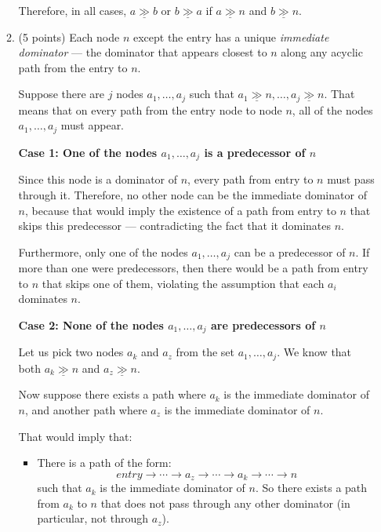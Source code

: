\documentclass[12pt]{article}
\newcommand{\dom}{\underline{\gg}}
\begin{document}
\begin{enumerate}
\begin{enumerate}
\begin{mdframed}
          \medskip

          Therefore, in all cases, $a \dom b$ or $b \dom a$ if $a \dom n$ and $b \dom n$.

        \end{mdframed}

        \item (5 points) Each node $n$ except the entry has a unique
        \emph{immediate dominator} --- the dominator that appears closest to $n$
        along any acyclic path from the entry to $n$.
        \begin{mdframed}
          Suppose there are $j$ nodes $a_1, \ldots, a_j$ such that $a_1 \dom n, \ldots, a_j \dom n$. That means that on every path from the entry node to node $n$, all of the nodes $a_1, \ldots, a_j$ must appear.

          \textbf{Case 1: One of the nodes $a_1, \ldots, a_j$ is a predecessor of $n$}

          Since this node is a dominator of $n$, every path from entry to $n$ must pass through it. Therefore, no other node can be the immediate dominator of $n$, because that would imply the existence of a path from entry to $n$ that skips this predecessor — contradicting the fact that it dominates $n$.

          Furthermore, only one of the nodes $a_1, \ldots, a_j$ can be a predecessor of $n$. If more than one were predecessors, then there would be a path from entry to $n$ that skips one of them, violating the assumption that each $a_i$ dominates $n$.

          \textbf{Case 2: None of the nodes $a_1, \ldots, a_j$ are predecessors of $n$}

          Let us pick two nodes $a_k$ and $a_z$ from the set $a_1, \ldots, a_j$. We know that both $a_k \dom n$ and $a_z \dom n$.

          Now suppose there exists a path where $a_k$ is the immediate dominator of $n$, and another path where $a_z$ is the immediate dominator of $n$.

          That would imply that:
          \begin{itemize}
            \item There is a path of the form:
            \[
            entry \rightarrow \cdots \rightarrow a_z \rightarrow \cdots \rightarrow a_k \rightarrow \cdots \rightarrow n
            \]
            such that $a_k$ is the immediate dominator of $n$. So there exists a path from $a_k$ to $n$ that does not pass through any other dominator (in particular, not through $a_z$).


\end{itemize}
\end{mdframed}
\end{enumerate}
\end{enumerate}
\end{document}
